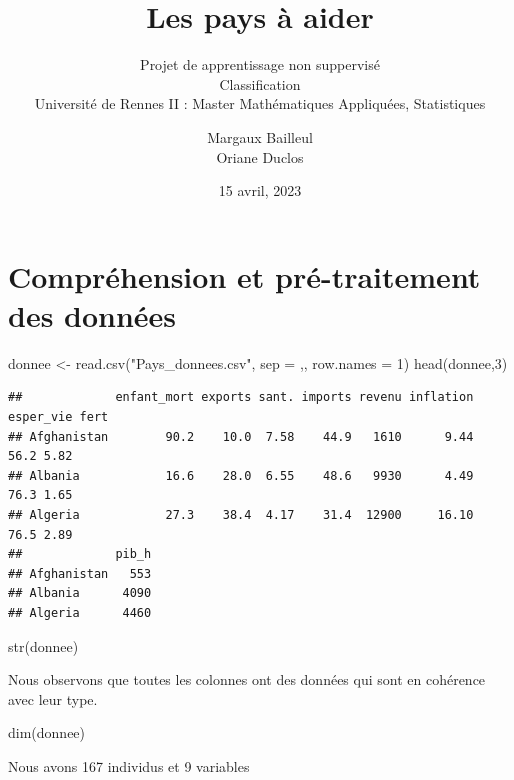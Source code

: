 \documentclass[
]{article}
\title{Les pays à aider}
\subtitle{Projet de apprentissage non suppervisé\\
Classification\\
Université de Rennes II : Master Mathématiques Appliquées, Statistiques}
\author{Margaux Bailleul\\
Oriane Duclos}
\date{15 avril, 2023}
\newenvironment{Shaded}{}{}
\newcommand{\AttributeTok}[1]{#1}
\newcommand{\DecValTok}[1]{#1}
\newcommand{\FunctionTok}[1]{#1}
\newcommand{\NormalTok}[1]{#1}
\newcommand{\OtherTok}[1]{\textcolor[rgb]{1.00,0.25,0.00}{#1}}
\newcommand{\StringTok}[1]{\textcolor[rgb]{0.00,0.50,0.50}{#1}}
\begin{document}
\maketitle

{
\setcounter{tocdepth}{2}
\tableofcontents
}
\hypertarget{compruxe9hension-et-pruxe9-traitement-des-donnuxe9es}{%
\section{Compréhension et pré-traitement des
données}\label{compruxe9hension-et-pruxe9-traitement-des-donnuxe9es}}

\begin{Shaded}
\begin{Highlighting}[]
\NormalTok{donnee }\OtherTok{\textless{}{-}} \FunctionTok{read.csv}\NormalTok{(}\StringTok{"Pays\_donnees.csv"}\NormalTok{, }\AttributeTok{sep =} \StringTok{\textquotesingle{},\textquotesingle{}}\NormalTok{, }\AttributeTok{row.names =} \DecValTok{1}\NormalTok{)}
\FunctionTok{head}\NormalTok{(donnee,}\DecValTok{3}\NormalTok{)}
\end{Highlighting}
\end{Shaded}

\begin{verbatim}
##             enfant_mort exports sant. imports revenu inflation esper_vie fert
## Afghanistan        90.2    10.0  7.58    44.9   1610      9.44      56.2 5.82
## Albania            16.6    28.0  6.55    48.6   9930      4.49      76.3 1.65
## Algeria            27.3    38.4  4.17    31.4  12900     16.10      76.5 2.89
##             pib_h
## Afghanistan   553
## Albania      4090
## Algeria      4460
\end{verbatim}

\begin{Shaded}
\begin{Highlighting}[]
\FunctionTok{str}\NormalTok{(donnee)}
\end{Highlighting}
\end{Shaded}

Nous observons que toutes les colonnes ont des données qui sont en
cohérence avec leur type.

\begin{Shaded}
\begin{Highlighting}[]
\FunctionTok{dim}\NormalTok{(donnee)}
\end{Highlighting}
\end{Shaded}

Nous avons 167 individus et 9 variables
\end{document}
